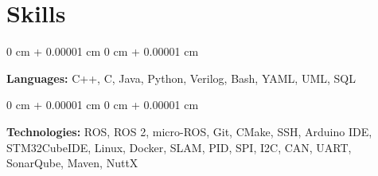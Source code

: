 \documentclass[10pt, letterpaper]{article}
\newenvironment{highlights}{
    \begin{itemize}[
        topsep=0.10 cm,
        parsep=0.10 cm,
        partopsep=0pt,
        itemsep=0pt,
        leftmargin=0 cm + 10pt
    ]
}{
    \end{itemize}
} %
\newenvironment{onecolentry}{
    \begin{adjustwidth}{
        0 cm + 0.00001 cm
    }{
        0 cm + 0.00001 cm
    }
}{
    \end{adjustwidth}
} %
\newenvironment{twocolentry}[2][]{
    \onecolentry
    \def\secondColumn{#2}
    \setcolumnwidth{\fill, 4.5 cm}
    \begin{paracol}{2}
}{
    \switchcolumn \raggedleft \secondColumn
    \end{paracol}
    \endonecolentry
} %
\newcommand{\customref}[3][primaryColor]{\href{#2}{\color{#1}{\underline{#3}}}}
\begin{document}





    
    \section{Skills}



        
        \begin{onecolentry}
            \textbf{Languages:} C++, C, Java, Python, Verilog, Bash, YAML, UML, SQL
        \end{onecolentry}


        \begin{onecolentry}
            \textbf{Technologies:} ROS, ROS 2, micro-ROS, Git, CMake, SSH, Arduino IDE, STM32CubeIDE, Linux, Docker, SLAM, 
            PID, SPI, I2C, CAN, UART, SonarQube, Maven, NuttX
        \end{onecolentry}


    
\end{document}
